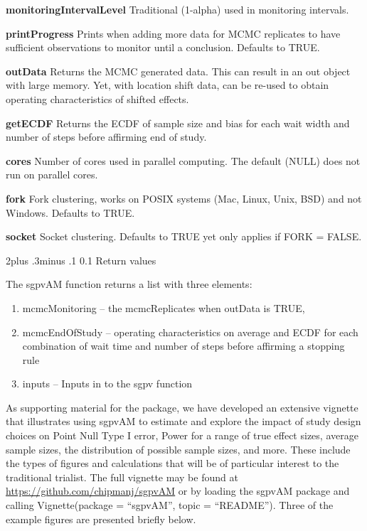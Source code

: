 \documentclass[12pt,oneside]{book}
\makeatletter
\providecommand{\tightlist}{%
  \setlength{\itemsep}{0pt}\setlength{\parskip}{0pt}}
\newlength{\li}\setlength{\li}{14.48pt}
\newlength{\di}\setlength{\di}{-3.5mm}
\renewcommand\subsection{\@startsection {subsection}{2}{\z@}%
    {2\@bls  plus .3\@bls minus .1\@bls}%
    {0.1\@bls}%
    {\noindent\normalfont}}
\theoremstyle{definition}
\theoremstyle{definition}
\theoremstyle{definition}
\theoremstyle{remark}
\makeatother
\begin{document}
\textbf{monitoringIntervalLevel} Traditional (1-alpha) used in
monitoring intervals.

\textbf{printProgress} Prints when adding more data for MCMC replicates
to have sufficient observations to monitor until a conclusion. Defaults
to TRUE.

\textbf{outData} Returns the MCMC generated data. This can result in an
out object with large memory. Yet, with location shift data, can be
re-used to obtain operating characteristics of shifted effects.

\textbf{getECDF} Returns the ECDF of sample size and bias for each wait
width and number of steps before affirming end of study.

\textbf{cores} Number of cores used in parallel computing. The default
(NULL) does not run on parallel cores.

\textbf{fork} Fork clustering, works on POSIX systems (Mac, Linux, Unix,
BSD) and not Windows. Defaults to TRUE.

\textbf{socket} Socket clustering. Defaults to TRUE yet only applies if
FORK = FALSE.

\hypertarget{return-values}{%
\subsection{Return values}\label{return-values}}

The sgpvAM function returns a list with three elements:

\begin{enumerate}
\def\labelenumi{\arabic{enumi}.}
\tightlist
\item
  mcmcMonitoring -- the mcmcReplicates when outData is TRUE,
\item
  mcmcEndOfStudy -- operating characteristics on average and ECDF for
  each combination of wait time and number of steps before affirming a
  stopping rule
\item
  inputs -- Inputs in to the sgpv function
\end{enumerate}

As supporting material for the package, we have developed an extensive
vignette that illustrates using sgpvAM to estimate and explore the
impact of study design choices on Point Null Type I error, Power for a
range of true effect sizes, average sample sizes, the distribution of
possible sample sizes, and more. These include the types of figures and
calculations that will be of particular interest to the traditional
trialist. The full vignette may be found at
\url{https://github.com/chipmanj/sgpvAM} or by loading the sgpvAM
package and calling Vignette(package = ``sgpvAM'', topic = ``README'').
Three of the example figures are presented briefly below.
\end{document}
